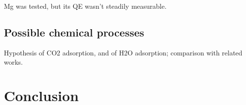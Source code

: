 \documentclass[aip,graphicx]{revtex4-1}
\begin{document}
Mg was tested, but its QE wasn't steadily measurable.

\subsection{Possible chemical processes}
Hypothesis of CO2 adsorption, and of H2O adsorption; comparison with related works.

\section{Conclusion}
\end{document}
